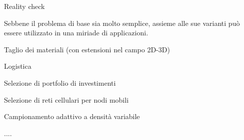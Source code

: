 \begin{frame}{Reality check}

Sebbene il problema di base sia molto semplice, assieme alle sue varianti può essere utilizzato in una miriade di applicazioni.

\BIL
\item Taglio dei materiali (con estensioni nel campo 2D-3D)
\item Logistica
\item Selezione di portfolio di investimenti
\item Selezione di reti cellulari per nodi mobili
\item Campionamento adattivo a densità variabile
\item ....
\EIL

\end{frame}





